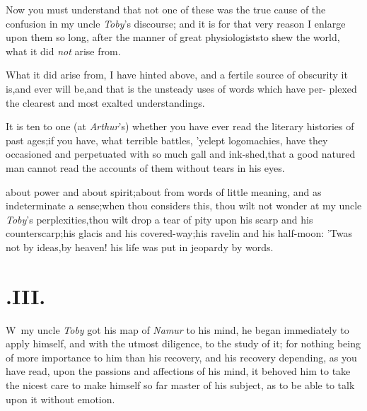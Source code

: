 \documentclass{article}
\begin{document}
Now you must understand that not one of these was the true cause
of the confusion in my uncle \textit{Toby}’s discourse; and it
is for that very reason I enlarge upon them so long, after the
manner of great physiologists\tsk to shew the world, what it did
\textit{not} arise from.

What it did arise from, I have hinted above, and a fertile
source of obscurity it is,\tsk and ever will be,\tsk and that
is the unsteady uses of words which have per- plexed the clearest
and most exalted understandings.

It is ten to one (at \textit{Arthur}’s) whether you have
ever read the literary histories of past ages;\tsk if you have,
what terrible battles, ’yclept logomachies, have they
occasioned and perpetuated with so much gall and
ink-shed,\tsk that a good natured man cannot read the accounts of
them without tears in his eyes.

\noindent
{}
about power and about spirit;\tsk about
from words of little meaning, and as
indeterminate a sense;\tsk when thou consi\-ders this, thou wilt not
wonder at my uncle \textit{Toby}’s perplexities,\tsk thou
wilt drop a tear of pity upon his scarp and his
counterscarp;\tsk his glacis and his covered-way;\tsk his
ravelin and his half-moon:\break
’Twas not by ideas,\tsh by heaven!\break
his life was put in jeopardy by words.

\bigskip

\section{.\enspace  III.}

\lettrine{W}{\,} my uncle \textit{Toby} got his map
of \textit{Namur} to his mind, he began immediately to apply himself,
and with the utmost diligence, to the study of it; for
nothing being of more importance to him than his recovery, and his
recovery depending, as you have read, upon the passions and
affections of his mind, it behoved him to take the nicest care to
make himself so far master of his subject, as to be able to talk
upon it without emotion.
\end{document}
